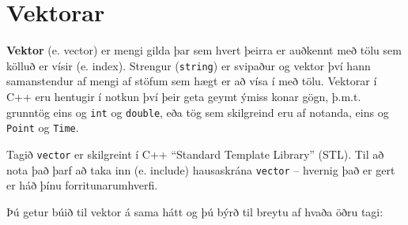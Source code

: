 





\chapter{Vektorar}
\label{vectors}

{\bf Vektor} (e. vector) er mengi gilda þar sem hvert þeirra er auðkennt með tölu sem kölluð er vísir (e. index).
Strengur ({\tt string}) er svipaður og vektor því hann samanstendur af mengi af stöfum sem hægt er að vísa í með tölu.
Vektorar í C++ eru hentugir í notkun því þeir geta geymt ýmiss konar gögn, þ.m.t. grunntög eins og {\tt int} og {\tt double}, 
eða tög sem skilgreind eru af notanda, eins og {\tt Point} og {\tt Time}.

Tagið {\tt vector} er skilgreint í C++ ``Standard Template Library'' (STL).
Til að nota það þarf að taka inn (e. include) hausaskrána {\tt vector} -- hvernig það er gert er háð þínu forritunarumhverfi.

Þú getur búið til vektor á sama hátt og þú býrð til breytu af hvaða öðru tagi:

